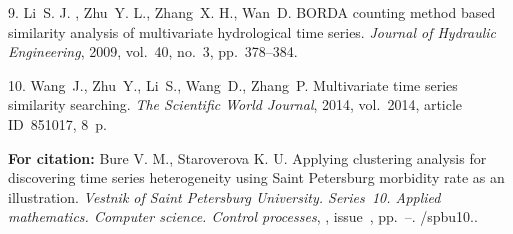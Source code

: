{9. Li~S. J. , Zhu~Y. L., Zhang~X. H., Wan~D. BORDA counting method
based similarity analysis of multivariate hydrological time
series. {\it Journal of Hydraulic Engineering}, 2009, vol.~40,
no.~3, pp.~378--384.

10. Wang~J., Zhu~Y., Li~S., Wang~D., Zhang~P. Multivariate time
series similarity searching. {\it The Scientific World Journal},
2014, vol.~2014, article ID~851017, 8~p.





\vskip 2mm

{\bf For citation:} Bure V. M., Staroverova K. U. Applying
clustering analysis for discovering time series heterogeneity
using Saint Petersburg morbidity rate as an illustration. {\it
Vestnik of Saint Petersburg University. Series~10. Applied
mathematics. Computer science. Control processes}, \issueyear,
issue~\issuenum, pp.~\pageref{p4}--\pageref{p4e}.
\doivyp/spbu10.\issueyear.



}
